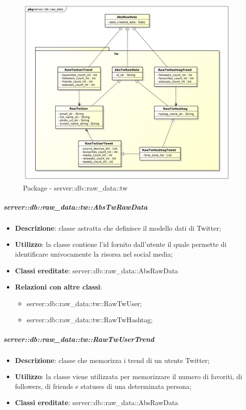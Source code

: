 

		\begin{figure}[htbp]
			\centering
			\centerline{\includegraphics[scale=0.45]{./images/server/raw_data_tw.pdf}}
			\caption{Package - server::db::raw\_data::tw}
		\end{figure}

		
		\subparagraph{server::db::raw\_data::tw::AbsTwRawData} %
		\label{subp:server_db_raw_data_tw_abstwrawdata}
			\begin{itemize}
				\item \textbf{Descrizione}: classe astratta che definisce il modello dati di Twitter;
				\item \textbf{Utilizzo}: la classe contiene l'id fornito dall'utente il quale permette di identificare univocamente la risorsa nel social media;
				\item \textbf{Classi ereditate}: server::db::raw\_data::AbsRawData
				\item \textbf{Relazioni con altre classi}:
					\begin{itemize}
						\item server::db::raw\_data::tw::RawTwUser;
						\item server::db::raw\_data::tw::RawTwHashtag;
					\end{itemize}
			\end{itemize}


		\subparagraph{server::db::raw\_data::tw::RawTwUserTrend} %
		\label{subp:server_db_raw_data_tw_rawigusertrend}
			\begin{itemize}
				\item \textbf{Descrizione}: classe che memorizza i trend di un utente Twitter;
				\item \textbf{Utilizzo}: la classe viene utilizzata per memorizzare il numero di favoriti, di followers, di friends e statuses di una determinata persona;
				\item \textbf{Classi ereditate}: server::db::raw\_data::AbsRawData
			\end{itemize}


